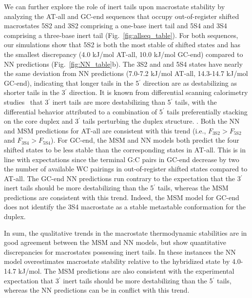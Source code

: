 \documentclass[journal=jpcbfk,manuscript=article]{achemso}
\begin{document}
We can further explore the role of inert tails upon macrostate stability by analyzing the AT-all and GC-end sequences that occupy out-of-register shifted macrostates 5S2 and 3S2 comprising a one-base inert tail and 5S4 and 3S4 comprising a three-base inert tail (Fig.~\ref{fig:allseq_table}). For both sequences, our simulations show that 5S2 is both the most stable of shifted states and has the smallest discrepancy (4.0 kJ/mol AT-all, 10.0 kJ/mol GC-end) compared to NN predictions (Fig.~\ref{fig:NN_table}b). The 3S2 and and 5S4 states have nearly the same deviation from NN predictions (7.0-7.2 kJ/mol AT-all, 14.3-14.7 kJ/mol GC-end), indicating that longer tails in the 5$^\prime$ direction are as destabilizing as shorter tails in the 3$^\prime$ direction. It is known from differential scanning calorimetry studies~\citep{Dickman2012ThermodynamicDNAs} that 3$^\prime$ inert tails are more destabilizing than 5$^\prime$ tails, with the differential behavior attributed to a combination of 5$^\prime$ tails preferentially stacking on the core duplex and 3$^\prime$ tails perturbing the duplex structure. \citep{Doktycz1990ThermodynamicATGC, Dickman2012ThermodynamicDNAs, Michele2014EHybridization}. Both the NN and MSM predictions for AT-all are consistent with this trend (i.e., $F_\mathrm{3S2} > F_\mathrm{5S2}$ and $F_\mathrm{3S4} > F_\mathrm{5S4}$). For GC-end, the MSM and NN models both predict the four shifted states to be less stable than the corresponding states in AT-all. This is in line with expectations since the terminal G:C pairs in GC-end decrease by two the number of available WC pairings in out-of-register shifted states compared to AT-all. The GC-end NN predictions run contrary to the expectation that the 3$^\prime$ inert tails should be more destabilizing than the 5$^\prime$ tails, whereas the MSM predictions are consistent with this trend. Indeed, the MSM model for GC-end does not identify the 3S4 macrostate as a stable metastable conformation for the duplex.


In sum, the qualitative trends in the macrostate thermodynamic stabilities are in good agreement between the MSM and NN models, but show quantitative discrepancies for macrostates possessing inert tails. In these instances the NN model overestimates macrostate stability relative to the hybridized state by 4.0-14.7 kJ/mol. The MSM predictions are also consistent with the experimental expectation that 3$^\prime$ inert tails should be more destabilizing than the 5$^\prime$ tails, whereas the NN predictions can be in conflict with this trend.
\end{document}
